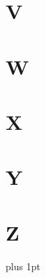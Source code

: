 \documentclass[]{memoir}
\begin{document}
\begin{multicols}{2}

\section*{V}


\section*{W}


\section*{X}


\section*{Y}


\section*{Z}


\end{multicols}
\parskip=0pt plus 1pt
\restoregeometry
\pagebreak


\cleardoublepage
{}
\setlength{\columnsep}{0.75cm}
\printindex

\end{document}
